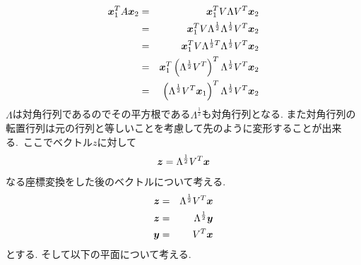\documentclass[dvipdfmx,a4j]{jsarticle}
\begin{document}
                  \begin{eqnarray*}
                    \mbox{\boldmath $x$}_{1}^{T}A\mbox{\boldmath $x$}_{2}&=&\mbox{\boldmath $x$}_{1}^{T}V\Lambda V^{T}\mbox{\boldmath $x$}_{2}\\
                                                                         &=&\mbox{\boldmath $x$}_{1}^{T}V\Lambda^{\frac{1}{2}}\Lambda^{\frac{1}{2}}V^{T}\mbox{\boldmath $x$}_{2}\\
                                                                         &=&\mbox{\boldmath $x$}_{1}^{T}V\Lambda^{\frac{1}{2}T}\Lambda^{\frac{1}{2}}V^{T}\mbox{\boldmath $x$}_{2}\\
                                                                         &=&\mbox{\boldmath $x$}_{1}^{T}\left(\Lambda^{\frac{1}{2}}V^{T}\right)^{T}\Lambda^{\frac{1}{2}}V^{T}\mbox{\boldmath $x$}_{2}\\
&=&\left(\Lambda^{\frac{1}{2}}V^{T}\mbox{\boldmath $x$}_{1}\right)^{T}\Lambda^{\frac{1}{2}}V^{T}\mbox{\boldmath $x$}_{2}
                  \end{eqnarray*}
                  $\Lambda$は対角行列であるのでその平方根である$\Lambda^{\frac{1}{2}}$も対角行列となる. また対角行列の転置行列は元の行列と等しいことを考慮して先のように変形することが出来る.\ ここでベクトル$z$に対して
                  \begin{eqnarray*}
                    \mbox{\boldmath $z$}=\Lambda^{\frac{1}{2}}V^{T}\mbox{\boldmath $x$}
                  \end{eqnarray*}
                  なる座標変換をした後のベクトルについて考える.\\
                  \begin{eqnarray*}
                    \mbox{\boldmath $z$}&=&\Lambda^{\frac{1}{2}}V^{T}\mbox{\boldmath $x$}\\
                    \mbox{\boldmath $z$}&=&\Lambda^{\frac{1}{2}}\mbox{\boldmath $y$}\\
                    \mbox{\boldmath $y$}&=&V^{T}\mbox{\boldmath $x$}
                  \end{eqnarray*}
                  とする. そして以下の平面について考える.
                  \begin{center}
                    \end{center}
\end{document}
